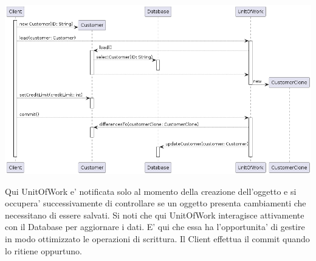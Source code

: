 \begin{center}
    \includegraphics[width=16cm]{images/unit-of-work/ControllerSD.png}
\end{center}

Qui UnitOfWork e' notificata solo al momento della creazione dell'oggetto e si occupera' successivamente di controllare se un oggetto presenta cambiamenti che necessitano di essere salvati.
Si noti che qui UnitOfWork interagisce attivamente con il Database per aggiornare i dati. E' qui che essa ha l'opportunita' di gestire in modo ottimizzato le operazioni di scrittura.
Il Client effettua il commit quando lo ritiene oppurtuno.
